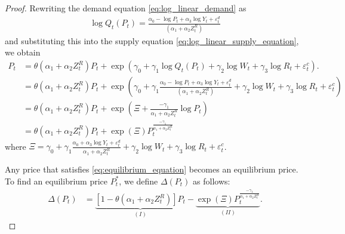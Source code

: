\documentclass[11pt, a4paper]{article}
\theoremstyle{remark}
\begin{document}
\begin{proof}
    
Rewriting the demand equation \eqref{eq:log_linear_demand} as 
\begin{align*}
    \log Q_{t}(P_{t})= \frac{\alpha_0 - \log P_{t} + \alpha_3 \log Y_t + \varepsilon^{d}_{t}}{(\alpha_1 + \alpha_2 Z^{R}_{t})}   
\end{align*}
and substituting this into the supply equation \eqref{eq:log_linear_supply_equation}, we obtain
\begin{align}
    P_t &=\theta (\alpha_1 + \alpha_2 Z^{R}_{t}) P_t + \exp\left(\gamma_0 + \gamma_1 \log Q_t(P_{t}) +  \gamma_2 \log W_{t} + \gamma_3 \log R_t + \varepsilon^{c}_{t}\right). \nonumber\\
    & = \theta(\alpha_1 + \alpha_2 Z^{R}_{t})P_t + \exp\left(\gamma_0 + \gamma_1 \frac{\alpha_0 - \log P_{t} + \alpha_3 \log Y_t + \varepsilon^{d}_{t}}{(\alpha_1 + \alpha_2 Z^{R}_{t})} +\gamma_2 \log W_{t} + \gamma_3 \log R_{t} + \varepsilon^{c}_{t} \right)\nonumber\\
    & = \theta(\alpha_1 + \alpha_2 Z^{R}_{t})P_t  + \exp\left(\Xi + \frac{-\gamma_1}{\alpha_1+\alpha_2 Z^{R}_t} \log P_t \right)\nonumber\\
    &= \theta(\alpha_1 + \alpha_2 Z^{R}_{t})P_t  + \exp(\Xi) P_t^{\frac{-\gamma_1}{\alpha_1 + \alpha_2 Z^{R}_{t}}} \label{eq:equilibrium_equation}
\end{align}
where $\Xi = \gamma_0 + \gamma_1\frac{\alpha_0 + \alpha_3 \log Y_t + \varepsilon^{d}_{t}}{\alpha_1 + \alpha_2 Z^{R}_{t}} +  \gamma_2 \log W_{t} + \gamma_3 \log R_t + \varepsilon^{c}_{t}$.

Any price that satisfies \eqref{eq:equilibrium_equation} becomes an equilibrium price.
To find an equilibrium price $P_{t}^*$, we define $\Delta(P_t)$ as follows:
\begin{align}
    \Delta(P_t)
    &= \underbrace{[1 - \theta (\alpha_1 + \alpha_2 Z^{R}_{t})]P_t}_{(I)} - \underbrace{\exp(\Xi) P_t^{\frac{-\gamma_1}{\alpha_1 + \alpha_2 Z^{R}_{t}}}}_{(II)} \label{eq:fixed_point}.
\end{align}


\end{proof}
\end{document}
